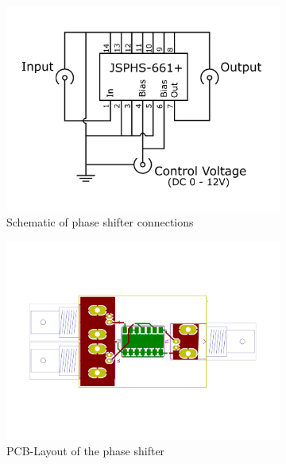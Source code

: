 \begin{figure}[ht]
	\centering
	\begin{subfigure}{0.4\textwidth}
		\centering
		\includegraphics[width=\textwidth]{Chapters/Deflection/circuit_phase4zu3}
		\caption{Schematic of phase shifter connections}
		\label{fig:circuit_phase}
	\end{subfigure}
	\hspace{0.1\textwidth}
	\begin{subfigure}{0.4\textwidth}
		\centering
		\includegraphics[width=\textwidth]{Chapters/Deflection/PCB_phase3}
		\caption{PCB-Layout of the phase shifter}
		\label{fig:PCB_phase}
	\end{subfigure}
	\caption{}
	\label{fig:PhaseShifter}
\end{figure}




